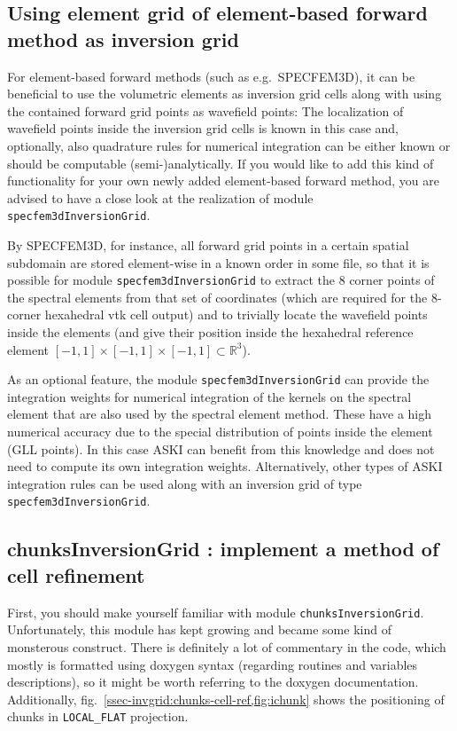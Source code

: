 \documentclass[12pt,a4paper]{article}
\newcommand{\lcode}[1]{\nolinkurl{#1}}
\newcommand{\lcodetitle}[1]{ {\ttfamily #1} }
\newcommand{\ASKI}{ {\ttfamily ASKI} }
\begin{document}
\subsection{Using element grid of element-based forward method as inversion grid} \label{ssec-invgrid:external}
%
For element-based forward methods (such as e.g.\ SPECFEM3D), it can be beneficial to use the volumetric elements
as inversion grid cells along with using the contained forward grid points as wavefield points: The localization
of wavefield points inside the inversion grid cells is known in this case and, optionally, also quadrature rules 
for numerical integration can be either known or should be computable (semi-)analytically.
If you would like to add this kind of functionality for your own newly added element-based forward method, you
are advised to have a close look at the realization of module \lcode{specfem3dInversionGrid}.

By SPECFEM3D, for instance, all forward grid points in a certain spatial subdomain are stored element-wise in a 
known order in some file, so that it is possible for module \lcode{specfem3dInversionGrid} to extract the 8 
corner points of the spectral elements from that set of coordinates (which are required for the 8-corner hexahedral 
vtk cell output) and to trivially locate the wavefield points inside the elements (and give their position
inside the hexahedral reference element $[-1,1]\times[-1,1]\times[-1,1] \subset \mathbb{R}^3$).

As an optional feature, the module \lcode{specfem3dInversionGrid} can provide the integration weights for 
numerical integration of the kernels on the spectral element that are also used by the spectral element method.
These have a high numerical accuracy due to the special distribution of points inside the element (GLL points).
In this case \ASKI{} can benefit from this knowledge and does not need to compute its own integration weights.
Alternatively, other types of \ASKI{} integration rules can be used along with an inversion grid of type 
\lcode{specfem3dInversionGrid}.

%
\subsection{\lcodetitle{chunksInversionGrid}: implement a method of cell refinement} \label{ssec-invgrid:chunks-cell-ref}
First, you should make yourself familiar with module \lcode{chunksInversionGrid}. Unfortunately, this module has
kept growing and became some kind of monsterous construct. There is definitely a lot of commentary in the
code, which mostly is formatted using doxygen syntax (regarding routines and variables descriptions), so it
might be worth referring to the doxygen documentation.
Additionally, fig.~\ref{ssec-invgrid:chunks-cell-ref,fig:ichunk} shows the positioning of chunks in 
\lcode{LOCAL_FLAT} projection.
\end{document}
